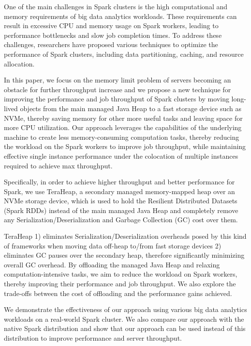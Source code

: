 \documentclass[twocolumn,10pt]{asme2e}
\begin{document}
One of the main challenges in Spark clusters is the high computational and memory requirements of big data analytics workloads. These requirements can result in excessive CPU and memory usage on Spark workers, leading to performance bottlenecks and slow job completion times. To address these challenges, researchers have proposed various techniques to optimize the performance of Spark clusters, including data partitioning, caching, and resource allocation.

In this paper, we focus on the memory limit problem of servers becoming an obstacle for further throughput increase and we propose a new technique for improving the performance and job throughput of Spark clusters by moving long-lived objects from the main managed Java Heap to a fast storage device such as NVMe, thereby saving memory for other more useful tasks and leaving space for more CPU utilization. Our approach leverages the capabilities of the underlying machine to create less memory-consuming computation tasks, thereby reducing the workload on the Spark workers to improve job throughput, while maintaining effective single instance performance under the colocation of multiple instances required to achieve max throughput.

Specifically, in order to achieve higher throughput and better performance for Spark, we use TeraHeap, a secondary managed memory-mapped heap over an NVMe storage device, which is used to hold the Resilient Distributed Datasets (Spark RDDs) instead of the main managed Java Heap and completely remove any Serialization/Deserialization and Garbage Collection (GC) cost over them.

TeraHeap 1) eliminates Serialization/Deserialization overheads posed by this kind of frameworks when moving data off-heap to/from fast storage devices 2) eliminates GC pauses over the secondary heap, therefore significantly minimizing overall GC overhead. By offloading the managed Java Heap and relaxing computation-intensive tasks, we aim to reduce the workload on Spark workers, thereby improving their performance and job throughput. We also explore the trade-offs between the cost of offloading and the performance gains achieved.

We demonstrate the effectiveness of our approach using various big data analytics workloads on a real-world Spark cluster. We also compare our approach with the native Spark distribution and show that our approach can be used instead of this distribution to improve performance and server throughput.
\end{document}
